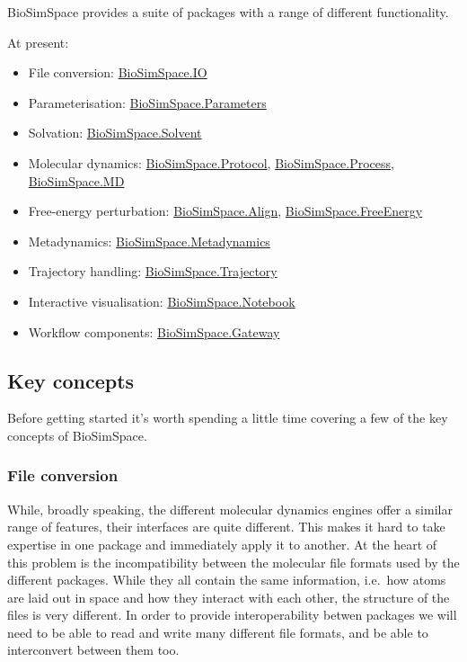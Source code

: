 BioSimSpace provides a suite of packages with a range of different
functionality.

At present:

\begin{itemize}
\tightlist
\item
  File conversion:
  \href{https://biosimspace.org/api/index_IO.html}{BioSimSpace.IO}
\item
  Parameterisation:
  \href{https://biosimspace.org/api/index_Parameters.html}{BioSimSpace.Parameters}
\item
  Solvation:
  \href{https://biosimspace.org/api/index_Solvent.html}{BioSimSpace.Solvent}
\item
  Molecular dynamics:
  \href{https://biosimspace.org/api/index_Protocol.html}{BioSimSpace.Protocol},
  \href{https://biosimspace.org/api/index_Process.html}{BioSimSpace.Process},
  \href{https://biosimspace.org/api/index_MD.html}{BioSimSpace.MD}
\item
  Free-energy perturbation:
  \href{https://biosimspace.org/api/index_Align.html}{BioSimSpace.Align},
  \href{https://biosimspace.org/api/index_FreeEnergy.html}{BioSimSpace.FreeEnergy}
\item
  Metadynamics:
  \href{https://biosimspace.org/api/index_Metadynamics.html}{BioSimSpace.Metadynamics}
\item
  Trajectory handling:
  \href{https://biosimspace.org/api/index_Trajectory.html}{BioSimSpace.Trajectory}
\item
  Interactive visualisation:
  \href{https://biosimspace.org/api/index_Notebook.html}{BioSimSpace.Notebook}
\item
  Workflow components:
  \href{https://biosimspace.org/api/index_Gateway.html}{BioSimSpace.Gateway}
\end{itemize}

\hypertarget{key-concepts}{%
\subsection{Key concepts}\label{key-concepts}}

Before getting started it's worth spending a little time covering a few
of the key concepts of BioSimSpace.

\hypertarget{file-conversion}{%
\subsubsection{File conversion}\label{file-conversion}}

While, broadly speaking, the different molecular dynamics engines offer
a similar range of features, their interfaces are quite different. This
makes it hard to take expertise in one package and immediately apply it
to another. At the heart of this problem is the incompatibility between
the molecular file formats used by the different packages. While they
all contain the same information, i.e.~how atoms are laid out in space
and how they interact with each other, the structure of the files is
very different. In order to provide interoperability betwen packages we
will need to be able to read and write many different file formats, and
be able to interconvert between them too.

